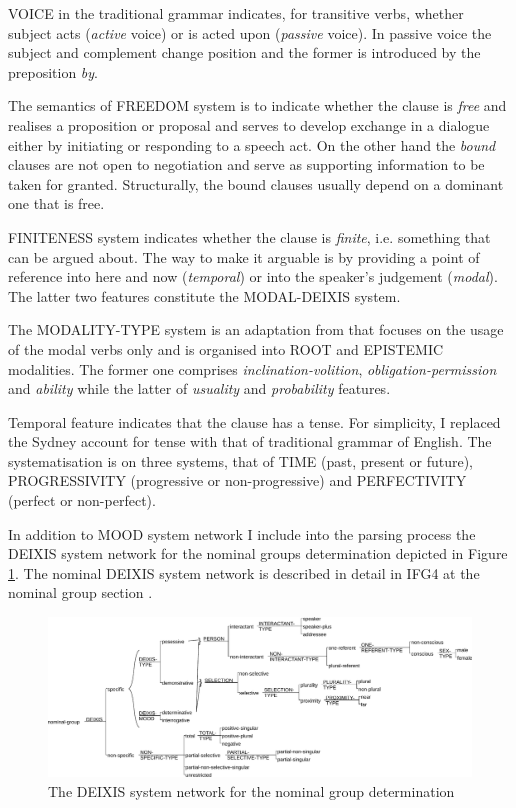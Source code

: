     VOICE in the traditional grammar indicates, for transitive verbs, whether subject acts (\textit{active} voice) or is acted upon (\textit{passive} voice). In passive voice the subject and complement change position and the former is introduced by the preposition \textit{by}. 
    
    The semantics of FREEDOM system is to indicate whether the clause is \textit{free} and realises a proposition or proposal and serves to develop exchange in a dialogue either by initiating or responding to a speech act. On the other hand the \textit{bound} clauses are not open to negotiation and serve as supporting information to be taken for granted. Structurally, the bound clauses usually depend on a dominant one that is free.
    
    FINITENESS system indicates whether the clause is \textit{finite}, i.e. something that can be argued about. The way to make it arguable is by providing a point of reference into here and now (\textit{temporal}) or into the speaker's judgement (\textit{modal}). The latter two features constitute the MODAL-DEIXIS system. 
    
    The MODALITY-TYPE system is an adaptation from \citep[689--692]{Halliday2013} that focuses on the usage of the modal verbs only and is organised into ROOT and EPISTEMIC modalities. The former one comprises \textit{inclination-volition}, \textit{obligation-permission} and \textit{ability} while the latter of \textit{usuality} and \textit{probability} features.
    
    Temporal feature indicates that the clause has a tense. For simplicity, I replaced the Sydney account for tense with   that of traditional grammar of English. The systematisation is on three systems, that of TIME (past, present or future), PROGRESSIVITY (progressive or non-progressive) and PERFECTIVITY (perfect or non-perfect).    
    
    In addition to MOOD system network I include into the parsing process the DEIXIS system network for the nominal groups determination depicted in Figure \ref{fig:ng-determination}. The nominal DEIXIS system network is described in detail in IFG4 at the nominal group section \citep[364--396]{Halliday2013}. 
    
    \begin{figure}[!ht]
        \centering
        \includegraphics[width=\linewidth]{Figures/SFL-grammar/determination-system.pdf}
        \caption{The DEIXIS system network for the nominal group determination \citep[366]{Halliday2013}}
        \label{fig:ng-determination}
    \end{figure}

